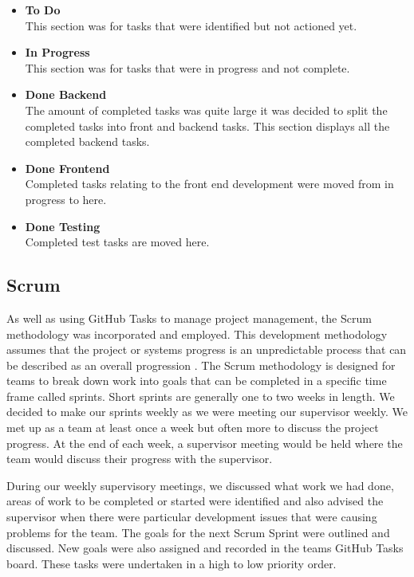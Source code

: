 \begin{itemize}
\item \textbf{To Do}\\
This section was for tasks that were identified but not actioned yet.
\item \textbf{In Progress}\\
This section was for tasks that were in progress and not complete.
\item \textbf{Done Backend}\\
The amount of completed tasks was quite large it was decided to split the completed tasks into front and backend tasks. This section displays all the completed backend tasks.
\item \textbf{Done Frontend}\\
Completed tasks relating to the front end development were moved from in progress to here.
\item \textbf{Done Testing}\\
Completed test tasks are moved here.
\end{itemize}

\vspace{50mm} %

\subsection{Scrum}
As well as using GitHub Tasks to manage project management, the Scrum methodology was incorporated and employed. This development methodology assumes that the project or systems progress is an unpredictable process that can be described as an overall progression \cite{schwaber1997scrum}. The Scrum methodology is designed for teams to break down work into goals that can be completed in a specific time frame called sprints. Short sprints are generally one to two weeks in length. We decided to make our sprints weekly as we were meeting our supervisor weekly. We met up as a team at least once a week but often more to discuss the project progress.
At the end of each week, a supervisor meeting would be held where the team would discuss their progress with the supervisor.

\vspace{5mm} %

During our weekly supervisory meetings, we discussed what work we had done, areas of work to be completed or started were identified and also advised the supervisor when there were particular development issues that were causing problems for the team. 
The goals for the next Scrum Sprint were outlined and discussed. New goals were also assigned and recorded in the teams GitHub Tasks board. These tasks were undertaken in a high to low priority order.

